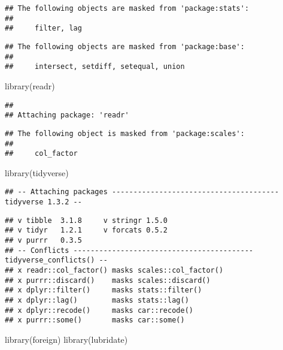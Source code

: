 \documentclass[
]{article}
\newenvironment{Shaded}{\begin{snugshade}}{\end{snugshade}}
\newcommand{\FunctionTok}[1]{\textcolor[rgb]{0.00,0.00,0.00}{#1}}
\newcommand{\NormalTok}[1]{#1}
\begin{document}
\begin{verbatim}
## The following objects are masked from 'package:stats':
## 
##     filter, lag
\end{verbatim}

\begin{verbatim}
## The following objects are masked from 'package:base':
## 
##     intersect, setdiff, setequal, union
\end{verbatim}

\begin{Shaded}
\begin{Highlighting}[]
\FunctionTok{library}\NormalTok{(readr)}
\end{Highlighting}
\end{Shaded}

\begin{verbatim}
## 
## Attaching package: 'readr'
\end{verbatim}

\begin{verbatim}
## The following object is masked from 'package:scales':
## 
##     col_factor
\end{verbatim}

\begin{Shaded}
\begin{Highlighting}[]
\FunctionTok{library}\NormalTok{(tidyverse)}
\end{Highlighting}
\end{Shaded}

\begin{verbatim}
## -- Attaching packages --------------------------------------- tidyverse 1.3.2 --
\end{verbatim}

\begin{verbatim}
## v tibble  3.1.8     v stringr 1.5.0
## v tidyr   1.2.1     v forcats 0.5.2
## v purrr   0.3.5     
## -- Conflicts ------------------------------------------ tidyverse_conflicts() --
## x readr::col_factor() masks scales::col_factor()
## x purrr::discard()    masks scales::discard()
## x dplyr::filter()     masks stats::filter()
## x dplyr::lag()        masks stats::lag()
## x dplyr::recode()     masks car::recode()
## x purrr::some()       masks car::some()
\end{verbatim}

\begin{Shaded}
\begin{Highlighting}[]
\FunctionTok{library}\NormalTok{(foreign)}
\FunctionTok{library}\NormalTok{(lubridate)}
\end{Highlighting}
\end{Shaded}
\end{document}
